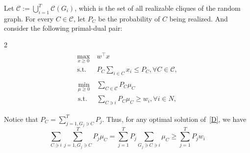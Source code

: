 \documentclass{article}
\begin{document}
Let $\mathcal{C}:= \bigcup_{i=1}^{T}\mathcal{C}(G_i)$, which is the set of all realizable cliques of the random graph.
For every $C\in\mathcal{C}$, let $P_C$ be the probability of $C$ being realized.
And consider the following primal-dual pair:
\begin{multicols}{2}
\noindent
\begin{align}
\label{P}
\tag{P}
\begin{split}
    \max_{x\geq 0} &\ w^{\top}x\\
    \text{s.t.} &\ P_C\sum_{i\in C} x_i\leq P_C,\forall C\in \mathcal{C},
\end{split}
\end{align}
\columnbreak
\begin{align}
\label{D}
\tag{D}
\begin{split}
    \min_{\mu\geq 0}&\ \sum_{C\in \mathcal{C}}P_C\mu_{C}\\
    \text{s.t.} &\ \sum_{C\ni i}P_C\mu_C\geq w_i,\forall i\in N,
\end{split}
\end{align}
\end{multicols}
Notice that $P_C=\sum_{j=1,G_j\ni C}^{T}P_{j}$.
Thus, for any optimal solution of~\ref{D}, we have 
\[
\sum_{C\ni i}\sum_{j=1,G_j\ni C}^{T}P_j\mu_C
= \sum_{j=1}^{T}P_j\sum_{G_j\ni C\ni i}\mu_C\geq \sum_{j=1}^{T}P_j w_i
\]
\end{document}
